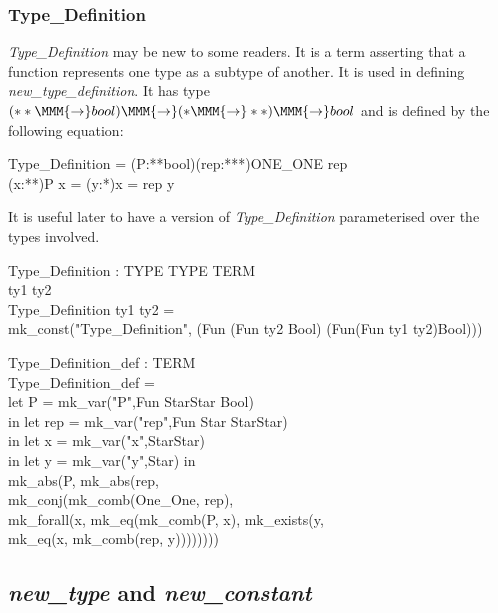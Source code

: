 \documentclass[a4paper,11pt,titlepage]{article}
\begin{document}
\begin{titlepage}
\subsubsection{Type\_Definition}

{\it Type\_Definition} may be new to some readers.
It is a term asserting that a function  represents
one type as a subtype of another. It is used
in defining {\it new\_type\_definition}.
It has type $(**\MMM{\rightarrow}bool)\MMM{\rightarrow}(*\MMM{\rightarrow}**)\MMM{\rightarrow}bool$ and
is defined by the following equation:
\begin{GFT}{}
\+Type\_Definition = \MMM{\lambda}(P:**\MMM{\rightarrow}bool)\MMM{\bullet}(rep:*\MMM{\rightarrow}**)\MMM{\bullet}ONE\_ONE rep\\
\+	\MMM{\land} \MMM{\forall}(x:**)\MMM{\bullet}P x = \MMM{\exists}(y:*)\MMM{\bullet}x = rep y\\
\end{GFT}
It is useful later to have a version of {\it Type\_Definition}
parameterised over the types involved.
\begin{HOLConst}
\+	\PrNL{}Type\_Definition\PrNN{} : TYPE \MMM{\rightarrow} TYPE \MMM{\rightarrow} TERM\\
\PrPH{}
\+	\MMM{\forall} ty1 ty2 \MMM{\bullet}\\
\+	Type\_Definition ty1 ty2 =\\
\+		mk\_const("Type\_Definition", (Fun (Fun ty2 Bool) (Fun(Fun ty1 ty2)Bool)))\\
\end{HOLConst}
\begin{HOLConst}
\+	\PrNL{}Type\_Definition\_def\PrNN{} : TERM\\
\PrPH{}
\+	Type\_Definition\_def =\\
\+	let P = mk\_var("P",Fun StarStar Bool)\\
\+	in let rep = mk\_var("rep",Fun Star StarStar)\\
\+	in let x = mk\_var("x",StarStar)\\
\+	in let y = mk\_var("y",Star) in\\
\+	mk\_abs(P, mk\_abs(rep,\\
\+		mk\_conj(mk\_comb(One\_One, rep),\\
\+			mk\_forall(x, mk\_eq(mk\_comb(P, x), mk\_exists(y,\\
\+				mk\_eq(x, mk\_comb(rep, y))))))))\\
\end{HOLConst}

\subsection{{\it new\_type} and {\it new\_constant}}


\end{titlepage}
\end{document}
